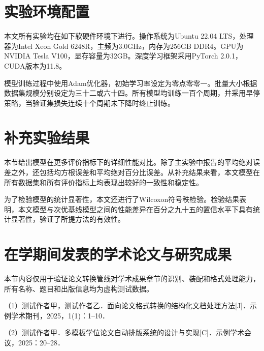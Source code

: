 \documentclass[12pt,a4paper,twoside]{ctexbook}
\begin{document}
\appendix

\chapter{实验环境配置}
本文所有实验均在如下软硬件环境下进行。操作系统为Ubuntu 22.04 LTS，处理器为Intel Xeon Gold 6248R，主频为3.0GHz，内存为256GB DDR4。GPU为NVIDIA Tesla V100，显存容量为32GB。深度学习框架采用PyTorch 2.0.1，CUDA版本为11.8。

模型训练过程中使用Adam优化器，初始学习率设定为零点零零一。批量大小根据数据集规模分别设定为三十二或六十四。所有模型均训练一百个周期，并采用早停策略，当验证集损失连续十个周期未下降时终止训练。

\chapter{补充实验结果}
本节给出模型在更多评价指标下的详细性能对比。除了主实验中报告的平均绝对误差之外，还包括均方根误差和平均绝对百分比误差。从补充结果来看，本文模型在所有数据集和所有评价指标上均表现出较好的一致性和稳定性。

为了检验模型的统计显著性，本文还进行了Wilcoxon符号秩检验。检验结果表明，本文模型与次优基线模型之间的性能差异在百分之九十五的置信水平下具有统计显著性，验证了所提方法的有效性。


\chapter{在学期间发表的学术论文与研究成果}

本节内容仅用于验证论文转换管线对学术成果章节的识别、装配和格式处理能力，所有名称、题目和出版信息均为虚构测试数据。

\noindent （1）测试作者甲，测试作者乙．面向论文格式转换的结构化文档处理方法[J]．示例学术期刊，2025，1(1)：1--10．

\noindent （2）测试作者甲．多模板学位论文自动排版系统的设计与实现[C]．示例学术会议，2025：20--28．
\end{document}
